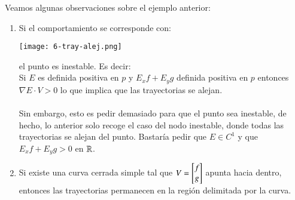 \begin{obs}
    Veamos algunas observaciones sobre el ejemplo anterior:\\
    \begin{enumerate}
        \item Si el comportamiento se corresponde con: %
            \begin{center}
                \texttt{[image: 6-tray-alej.png]}
            \end{center}
             el punto es inestable. Es decir:\\
             Si $E$ es definida positiva en $p$ y $E_x f + E_y g$ definida positiva en $p$ entonces $\nabla E \cdot V > 0$ lo que implica que las trayectorias se alejan.\\\\
             Sin embargo, esto es pedir demasiado para que el punto sea inestable, de hecho, lo anterior solo recoge el caso del nodo inestable, donde todas las trayectorias se alejan del punto. Bastaría pedir que $E \in C^1$ y que $E_x f + E_y g > 0$ en $\mathbb{R}$.
        \item Si existe una curva cerrada simple tal que $V = \mx{f\\ g}$ apunta hacia dentro, entonces las trayectorias permanecen en la región delimitada por la curva.
    \end{enumerate}
\end{obs}
